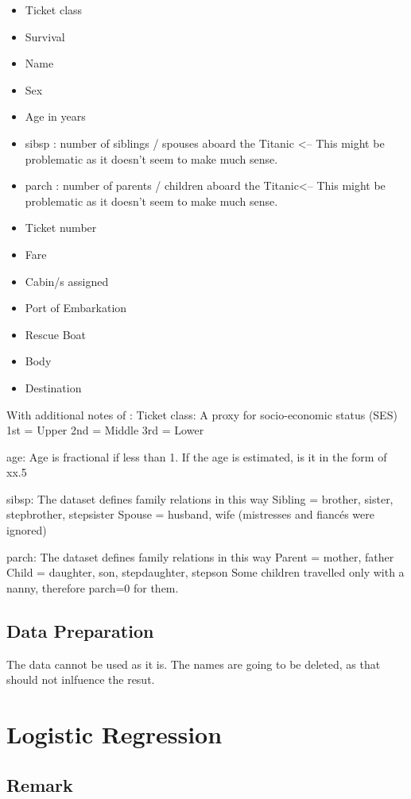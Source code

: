 \documentclass{article}
\begin{document}
\begin{itemize}
\item Ticket class
\item Survival 
\item Name
\item Sex
\item Age in years
\item sibsp : number of siblings / spouses aboard the Titanic <-- This might be problematic as it doesn't seem to make much sense.
\item parch : number of parents / children aboard the Titanic<-- This might be problematic as it doesn't seem to make much sense.
\item Ticket number	
\item Fare
\item Cabin/s assigned
\item Port of Embarkation	
\item Rescue Boat
\item Body
\item Destination
\end{itemize}

With additional notes of :
Ticket class: A proxy for socio-economic status (SES)
1st = Upper
2nd = Middle
3rd = Lower

age: Age is fractional if less than 1. If the age is estimated, is it in the form of xx.5

sibsp: The dataset defines family relations in this way
Sibling = brother, sister, stepbrother, stepsister
Spouse = husband, wife (mistresses and fiancés were ignored)

parch: The dataset defines family relations in this way
Parent = mother, father
Child = daughter, son, stepdaughter, stepson
Some children travelled only with a nanny, therefore parch=0 for them.



\subsection{Data Preparation}
The data cannot be used as it is.
The names are going to be deleted, as that should not inlfuence the resut.

\section{Logistic Regression}
\subsection{Remark}
\end{document}
